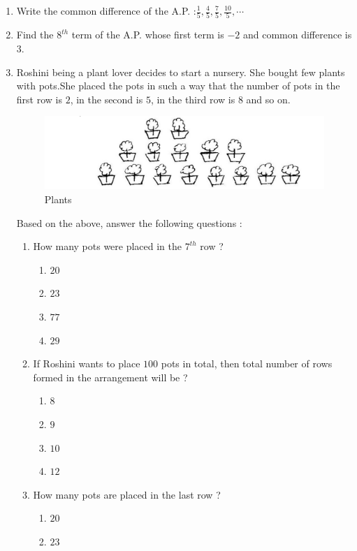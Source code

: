 \documentclass[10pt]{article}
\begin{document}
\begin{enumerate}
	\item Write the common difference of the A.P. :$\frac{1}{5}, \frac{4}{5}, \frac{7}{5}, \frac{10}{5}, \cdots$

	\item Find the $8^{th}$ term of the A.P. whose first term is $-2$ and common difference is $3$.
	\item
	Roshini being a plant lover decides to start a nursery. She bought few plants with pots.She placed the pots in such a way that the number of pots in the first row is $2$, in the second is $5$, in the third row is $8$ and so on.
		\begin{figure}[h]
			\centering	
			\includegraphics[width=\columnwidth]{figs/Plant.png}
			\caption{Plants}
			\label{fig:Plants}
		\end{figure}
		Based on the above, answer the following questions :
		\begin{enumerate}[label=(\roman*)]
			\item How many pots were placed in the $7^{th}$ row ?
				\begin{enumerate}[label=\Alph*]
					\item $20$
					\item $23$
					\item $77$
					\item $29$
				\end{enumerate}
			\item If Roshini wants to place $100$ pots in total, then total number of rows formed in the arrangement will be ?
				\begin{enumerate}[label=\Alph*]
					\item $8$
					\item $9$
					\item $10$
					\item $12$
				\end{enumerate}
			\item How many pots are placed in the last row ?
				\begin{enumerate}[label=\Alph*]
					\item $20$
					\item $23$

\end{enumerate}
\end{enumerate}
\end{enumerate}
\end{document}
